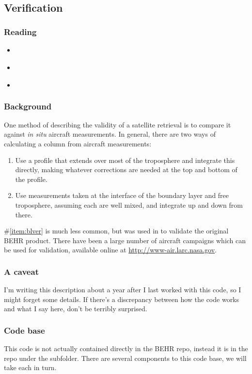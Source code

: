 \documentclass[12pt]{article}
\begin{document}
	\subsection{Verification}
		\subsubsection{Reading}
		\begin{itemize}
		\item \citealt{bucsela08}
		\item \citealt{hains10}
		\item \citealt{russell11}
		\end{itemize}
		
		\subsubsection{Background}
		One method of describing the validity of a satellite retrieval is to compare it against \emph{in situ} aircraft measurements. In general, there are two ways of calculating a column from aircraft measurements:
		\begin{enumerate}
		\item Use a profile that extends over most of the troposphere and integrate this directly, making whatever corrections are needed at the top and bottom of the profile.
		\item \label{item:blver} Use measurements taken at the interface of the boundary layer and free troposphere, assuming each are well mixed, and integrate up and down from there.
		\end{enumerate}
		
		\#\ref{item:blver} is much less common, but was used in \citet{russell11} to validate the original BEHR product.  There have been a large number of aircraft campaigns which can be used for validation, available online at \url{http://www-air.larc.nasa.gov}.
		
		\subsubsection{A caveat}
		I'm writing this description about a year after I last worked with this code, so I might forget some details. If there's a discrepancy between how the code works and what I say here, don't be terribly surprised.
		
		\subsubsection{Code base}
		This code is not actually contained directly in the BEHR repo, instead it is in the  repo under the  subfolder. There are several components to this code base, we will take each in turn.
\end{document}
